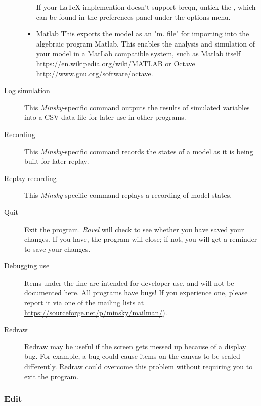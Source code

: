 \begin{description}
\begin{itemize}
If your LaTeX implemention doesn't support breqn, untick the , which can be found in the
preferences panel under the options menu. 
\item Matlab This exports the model as an "m. file" for importing into
the algebraic program Matlab. This enables the analysis and simulation
of your model in a MatLab compatible system, such as Matlab itself
\url{https://en.wikipedia.org/wiki/MATLAB} or Octave \url{http://www.gnu.org/software/octave}.
\end{itemize}
\item [{Log simulation}] This \emph{Minsky}-specific command outputs the
results of simulated variables into a CSV data file for later use
in other programs.
\item [{Recording}] This \emph{Minsky}-specific command records the states
of a model as it is being built for later replay.
\item [{Replay recording}] This \emph{Minsky}-specific command replays
a recording of model states.
\item [{Quit}] Exit the program. \emph{Ravel} will check to see whether
you have saved your changes. If you have, the program will close;
if not, you will get a reminder to save your changes.
\item [{Debugging use}] Items under the line are intended for developer
use, and will not be documented here. All programs have bugs! If you
experience one, please report it via one of the mailing lists at \url{https://sourceforge.net/p/minsky/mailman/}).
\item [{Redraw}] Redraw may be useful if the screen gets messed up because
of a display bug. For example, a bug could cause items on the canvas
to be scaled differently. Redraw could overcome this problem without
requiring you to exit the program.
\end{description}

\subsubsection{Edit}

